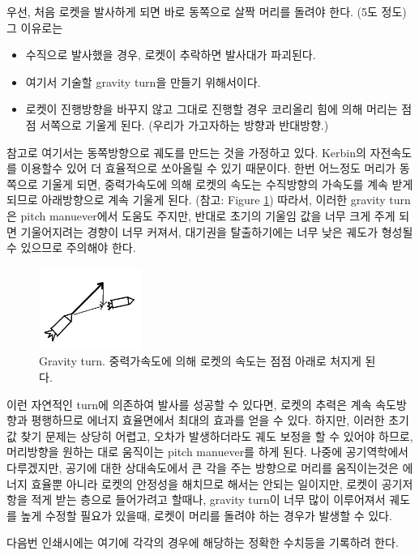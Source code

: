 \documentclass[9pt,twoside,openany]{amsbook}
\begin{document}
우선, 처음 로켓을 발사하게 되면 바로 동쪽으로 살짝 머리를 돌려야 한다. (5도 정도) 그 이유로는 
\begin{itemize}
\item 수직으로 발사했을 경우, 로켓이 추락하면 발사대가 파괴된다.
\item 여기서 기술할 gravity turn을 만들기 위해서이다.
\item 로켓이 진행방향을 바꾸지 않고 그대로 진행할 경우 코리올리 힘에 의해 머리는 점점 서쪽으로 기울게 된다. (우리가 가고자하는 방향과 반대방향.)
\end{itemize}
참고로 여기서는 동쪽방향으로 궤도를 만드는 것을 가정하고 있다. Kerbin의 자전속도를 이용할수 있어 더 효율적으로 쏘아올릴 수 있기 때문이다.
한번 어느정도 머리가 동쪽으로 기울게 되면, 중력가속도에 의해 로켓의 속도는 수직방향의 가속도를 계속 받게 되므로 아래방향으로 계속 기울게 된다. (참고: Figure \ref{fig:gravturn})
따라서, 이러한 gravity turn은 pitch manuever에서 도움도 주지만, 반대로 초기의 기울임 값을 너무 크게 주게 되면 기울어지려는 경향이 너무 커져서, 대기권을 탈출하기에는 너무 낮은 궤도가 형성될수 있으므로 주의해야 한다.

\begin{figure}
\caption{Gravity turn. 중력가속도에 의해 로켓의 속도는 점점 아래로 처지게 된다.}
\label{fig:gravturn}
\includegraphics[width = 0.3\textwidth]{gravityturn.png}
\end{figure}

이런 자연적인 turn에 의존하여 발사를 성공할 수 있다면, 로켓의 추력은 계속 속도방향과 평행하므로 에너지 효율면에서 최대의 효과를 얻을 수 있다. 하지만, 이러한 초기값 찾기 문제는 상당히 어렵고, 오차가 발생하더라도 궤도 보정을 할 수 있어야 하므로, 머리방향을 원하는 대로 움직이는 pitch manuever를 하게 된다. 
나중에 공기역학에서 다루겠지만, 공기에 대한 상대속도에서 큰 각을 주는 방향으로 머리를 움직이는것은 에너지 효율뿐 아니라 로켓의 안정성을 해치므로 해서는 안되는 일이지만,
로켓이 공기저항을 적게 받는 층으로 들어가려고 할때나, gravity turn이 너무 많이 이루어져서 궤도를 높게 수정할 필요가 있을때, 로켓이 머리를 돌려야 하는 경우가 발생할 수 있다.

다음번 인쇄시에는 여기에 각각의 경우에 해당하는 정확한 수치등을 기록하려 한다.
\end{document}
